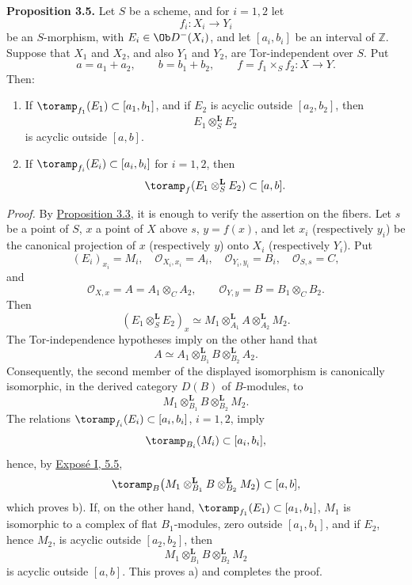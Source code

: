 \textbf{Proposition 3.5.} Let \(S\) be a scheme, and for \(i=1,2\) let
\[
  f_i:X_i\longrightarrow Y_i
\]
be an \(S\)-morphism, with \(E_i\in \Ob D^{-}(X_i)\), and let \([a_i,b_i]\) be an interval of \(\mathbb Z\). Suppose that \(X_1\) and \(X_2\), and also \(Y_1\) and \(Y_2\), are Tor-independent over \(S\). Put
\[
  a=a_1+a_2,\qquad b=b_1+b_2,\qquad
  f=f_1\times_S f_2:X\to Y.
\]
Then:
\begin{enumerate}[label=\alph*)]
\item If \(\toramp_{f_1}(E_1)\subset[a_1,b_1]\), and if \(E_2\) is acyclic outside \([a_2,b_2]\), then
\[
  E_1\otimes_S^{\mathbf L}E_2
\]
is acyclic outside \([a,b]\).

\item If \(\toramp_{f_i}(E_i)\subset[a_i,b_i]\) for \(i=1,2\), then
\[
  \toramp_f(E_1\otimes_S^{\mathbf L}E_2)\subset[a,b].
\]
\end{enumerate}

\emph{Proof.} By \hyperlink{sga6.e03.prop.3-3}{Proposition 3.3}, it is enough to verify the assertion on the fibers. Let \(s\) be a point of \(S\), \(x\) a point of \(X\) above \(s\), \(y=f(x)\), and let \(x_i\) (respectively \(y_i\)) be the canonical projection of \(x\) (respectively \(y\)) onto \(X_i\) (respectively \(Y_i\)). Put
\[
  (E_i)_{x_i}=M_i,\quad
  \mathcal O_{X_i,x_i}=A_i,\quad
  \mathcal O_{Y_i,y_i}=B_i,\quad
  \mathcal O_{S,s}=C,
\]
and
\[
  \mathcal O_{X,x}=A=A_1\otimes_C A_2,\qquad
  \mathcal O_{Y,y}=B=B_1\otimes_C B_2.
\]
Then
\[
  (E_1\otimes_S^{\mathbf L}E_2)_x
  \simeq
  M_1\otimes_{A_1}^{\mathbf L} A
  \otimes_{A_2}^{\mathbf L} M_2.
\]
The Tor-independence hypotheses imply on the other hand that
\[
  A\simeq A_1\otimes_{B_1}^{\mathbf L}B
       \otimes_{B_2}^{\mathbf L}A_2.
\]
Consequently, the second member of the displayed isomorphism is canonically isomorphic, in the derived category \(D(B)\) of \(B\)-modules, to
\[
  M_1\otimes_{B_1}^{\mathbf L}B
       \otimes_{B_2}^{\mathbf L}M_2.
\]
The relations \(\toramp_{f_i}(E_i)\subset[a_i,b_i]\), \(i=1,2\), imply
\[
  \toramp_{B_i}(M_i)\subset[a_i,b_i],
\]
hence, by \hyperlink{sga6.e01.para.5-5}{Exposé I, 5.5},
\[
  \toramp_B\bigl(M_1\otimes_{B_1}^{\mathbf L}B
  \otimes_{B_2}^{\mathbf L}M_2\bigr)\subset[a,b],
\]
which proves b). If, on the other hand, \(\toramp_{f_1}(E_1)\subset[a_1,b_1]\), \(M_1\) is isomorphic to a complex of flat \(B_1\)-modules, zero outside \([a_1,b_1]\), and if \(E_2\), hence \(M_2\), is acyclic outside \([a_2,b_2]\), then
\[
  M_1\otimes_{B_1}^{\mathbf L}B\otimes_{B_2}^{\mathbf L}M_2
\]
is acyclic outside \([a,b]\). This proves a) and completes the proof.

